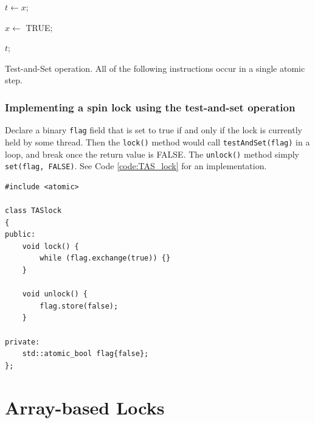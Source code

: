 \begin{algorithm}[H]
    \BlankLine
    $t \leftarrow x$;
    
    $x \leftarrow $ TRUE;
    
    \Return $t$;
    \caption{Test-and-Set operation. All of the following instructions occur in a single atomic step.}
    \label{alg:testAndSet}
\end{algorithm}

\subsubsection{Implementing a spin lock using the test-and-set operation}
Declare a binary \verb|flag| field that is set to true if and only if the lock is currently held by some thread. Then the \verb|lock()| method would call \verb|testAndSet(flag)| in a loop, and break once the return value is FALSE. The \verb|unlock()| method simply \verb|set(flag, FALSE)|. See Code \ref{code:TAS_lock} for an implementation.

\makebox[\linewidth]{\rule{17cm}{0.4pt}}
{\centering \label{code:TAS_lock}
\begin{verbatim}
#include <atomic>

class TASlock
{
public:
    void lock() {
        while (flag.exchange(true)) {}
    }

    void unlock() {
        flag.store(false);
    }

private:
    std::atomic_bool flag{false};
};
\end{verbatim}
\makebox[\linewidth]{\rule{17cm}{0.4pt}}
}

\section{Array-based Locks}
\begin{definition}
    
\end{definition}

\begin{definition}
    
\end{definition}
